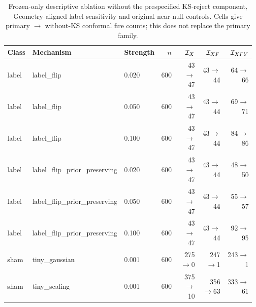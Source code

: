 \begin{table}[!t]
\caption{Frozen-only descriptive ablation without the prespecified KS-reject component, Geometry-aligned label sensitivity and original near-null controls. Cells give primary $\rightarrow$ without-KS conformal fire counts; this does not replace the primary family.}
\label{tab:v137-without-ks-5}
\centering\footnotesize\renewcommand{\arraystretch}{0.90}\setlength{\tabcolsep}{4pt}
\begin{tabular}{@{}lllrrrr@{}}
\toprule
Class & Mechanism & Strength & $n$ & $\mathcal I_X$ & $\mathcal I_{XF}$ & $\mathcal I_{XFY}$ \\
\midrule
label & label\_flip & 0.020 & 600 & 43$\rightarrow$47 & 43$\rightarrow$44 & 64$\rightarrow$66 \\
label & label\_flip & 0.050 & 600 & 43$\rightarrow$47 & 43$\rightarrow$44 & 69$\rightarrow$71 \\
label & label\_flip & 0.100 & 600 & 43$\rightarrow$47 & 43$\rightarrow$44 & 84$\rightarrow$86 \\
label & label\_flip\_prior\_preserving & 0.020 & 600 & 43$\rightarrow$47 & 43$\rightarrow$44 & 48$\rightarrow$50 \\
label & label\_flip\_prior\_preserving & 0.050 & 600 & 43$\rightarrow$47 & 43$\rightarrow$44 & 55$\rightarrow$57 \\
label & label\_flip\_prior\_preserving & 0.100 & 600 & 43$\rightarrow$47 & 43$\rightarrow$44 & 92$\rightarrow$95 \\
sham & tiny\_gaussian & 0.001 & 600 & 275$\rightarrow$0 & 247$\rightarrow$1 & 243$\rightarrow$1 \\
sham & tiny\_scaling & 0.001 & 600 & 375$\rightarrow$10 & 356$\rightarrow$63 & 333$\rightarrow$61 \\
\bottomrule
\end{tabular}
\end{table}
